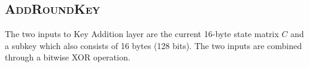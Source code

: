 \subsection{\textsc{AddRoundKey}}
\label{sec:AddRoundKey}

The two inputs to Key Addition layer are the current 16-byte state matrix $C$ and a subkey which also consists of 16 bytes (128 bits).
The two inputs are combined through a bitwise XOR operation.

